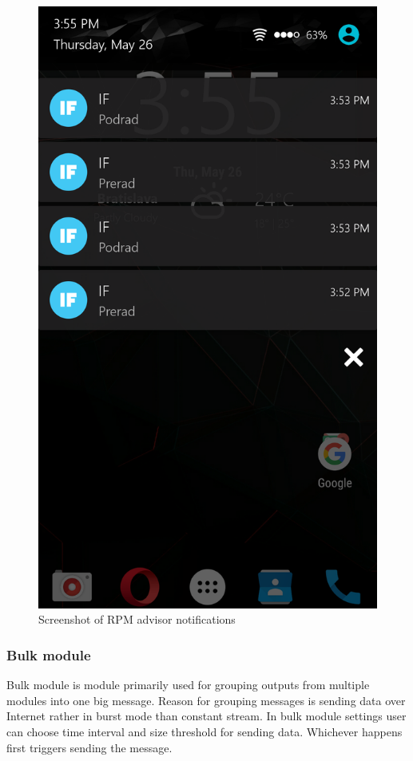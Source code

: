 \begin{figure}[H]
\begin{center}
\captionsetup{font=small}
\includegraphics[scale=0.2]{pics/mobil_screen.png}
\caption{Screenshot of RPM advisor notifications}
\label{fig:mobile_screen}
\end{center}
\end{figure}
\subsubsection{Bulk module} %
Bulk module is module primarily used for grouping outputs from multiple modules into one big message. Reason for grouping messages is sending data over Internet rather in burst mode than constant stream. In bulk module settings user can choose time interval and size threshold for sending data. Whichever happens first triggers sending the message.
\label{ssub:bulk_module}
